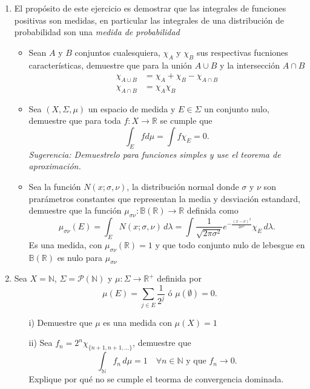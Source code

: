 \documentclass[letterpaper]{article}
\newcommand{\nat}{\ensuremath{ \mathbb N }}
\newcommand{\sig}{\ensuremath{\Sigma}}
\newcommand{\re}{\ensuremath{\mathbb R }}
\begin{document}
\begin{enumerate}
\item El propósito de este ejercicio es demostrar que las integrales de funciones positivas son medidas, en particular las integrales de una distribución de probabilidad son una \emph{medida de probabilidad}
  \begin{itemize}
  \item Sean $A$ y $B$ conjuntos cualesquiera, $\chi_A$ y $\chi_B$ sus respectivas fucniones características, demuestre que para la unión $A\cup B$ y la intersección $A\cap B$
    \begin{align*}
    \chi_{A\cup B}&=\chi_A+\chi_B-\chi_{A\cap B}\\
    \chi_{A\cap B}&=\chi_A\chi_B
    \end{align*}
  \item Sea $(X,\sig,\mu)$ un espacio de medida y $E\in\sig$ un conjunto nulo, demuestre que para toda $f:X\to\re$ se cumple que
    \[
    \int_E f d\mu=\int f\chi_E=0.
    \]
  \emph{Sugerencia: Demuestrelo para funciones simples y use el teorema de aproximación.}
  \item Sea la función $N(x;\sigma,\nu)$, la distribución normal donde $\sigma$ y $\nu$ son prarámetros constantes que representan la media y desviación estandard, demuestre que la función $\mu_{\sigma\nu}:\mathbb{B}(\re)\to\re$ definida como
  \[
  \mu_{\sigma\nu}(E)=\int_{E}N(x;\sigma,\nu)\,d\lambda=\int\frac{1}{\sqrt{2\pi\sigma^2}}e^{-\frac{(x-\nu)^2}{2\sigma^2}}\chi_E\,d\lambda.
  \]
  Es una medida, con $\mu_{\sigma\nu}(\re)=1$ y que todo conjunto nulo de lebesgue en $\mathbb{B}(\re)$ es nulo para $\mu_{\sigma\nu}$\\
  \end{itemize}
\item Sea $X=\nat$, $\sig=\mathcal{P}(\nat)$ y $\mu:\sig\to\re^{+}$ definida por
  \[
  \mu(E)=\sum_{j\in E}  \frac{1}{2^j}\text{ ó }\mu(\emptyset)=0.
  \]
\begin{itemize}
  \item[i)] Demuestre que $\mu$ es una medida con $\mu(X)=1$
  \item[ii)] Sea $f_n=2^n\chi_{\{n+1,n+1,\dots\}}$, demuestre que
      \[
      \int_{\nat}f_n\,d\mu=1 \quad\forall n\in\nat\text{ y que } f_n\to 0.
      \]
      Explique por qué no se cumple el teorma de convergencia dominada.
\end{itemize}
\end{enumerate}
\end{document}
